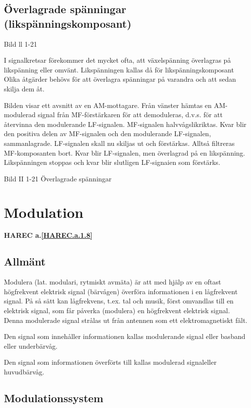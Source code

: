 \subsection{Överlagrade spänningar
(likspänningskomposant)}

Bild ll 1-21

I signalkretsar förekommer det mycket ofta, att växelspänning överlagras på likspänning
eller omvänt. Likspänningen kallas då för likspänningskomposant Olika åtgärder behövs för
att överlagra spänningar på varandra och att sedan skilja dem åt.

Bilden visar ett avsnitt av en AM-mottagare. Från vänster hämtas en AM-modulerad signal
från MF-förstärkaren för att demoduleras, d.v.s. för att återvinna den modulerande
LF-signalen. MF-signalen halvvågslikriktas. Kvar blir den positiva delen av MF-signalen
och den modulerande LF-signalen, sammanlagrade. LF-signalen skall nu skiljas ut och
förstärkas. Alltså filtreras MF-komposanten bort. Kvar blir LF-signalen, men överlagrad på
en likspänning. Likspänningen stoppas och kvar blir slutligen LF-signaien som förstärks.

Bild II 1-21 Överlagrade spänningar

\cleardoublepage

\section{Modulation}
\textbf{HAREC a.\ref{HAREC.a.1.8}\label{myHAREC.a.1.8}}

\subsection{Allmänt}

Modulera (lat. modulari, rytmiskt avmäta) är att med hjälp av en oftast högfrekvent
elektrisk signal (bärvågen) överföra informationen i en lågfrekvent signal. På så sätt kan
lågfrekvens, t.ex. tal och musik, först omvandlas till en elektrisk signal, som får 
påverka (modulera) en högfrekvent elektrisk signal. Denna modulerade signal strålas ut från
antennen som ett elektromagnetiskt fält.

Den signal som innehåller informationen kallas modulerande signal eller basband eller
underbärvåg.

Den signal som informationen överförts till kallas modulerad signaleller huvudbärvåg.

\subsection{Modulationssystem}

